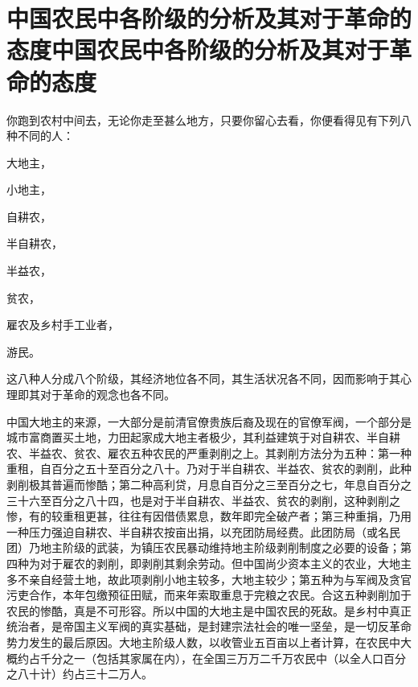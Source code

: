 \section[中国农民中各阶级的分析及其对于革命的态度中国农民中各阶级的分析及其对于革命的态度]{中国农民中各阶级的分析及其对于革命的态度中国农民中各阶级的分析及其对于革命的态度}


你跑到农村中间去，无论你走至甚么地方，只要你留心去看，你便看得见有下列八种不同的人：

大地主，

小地主，

自耕农，

半自耕农，

半益农，

贫农，

雇农及乡村手工业者，

游民。

这八种人分成八个阶级，其经济地位各不同，其生活状况各不同，因而影响于其心理即其对于革命的观念也各不同。

中国大地主的来源，一大部分是前清官僚贵族后裔及现在的官僚军阀，一个部分是城市富商置买土地，力田起家成大地主者极少，其利益建筑于对自耕农、半自耕农、半益农、贫农、雇农五种农民的严重剥削之上。其剥削方法分为五种：第一种重租，自百分之五十至百分之八十。乃对于半自耕农、半益农、贫农的剥削，此种剥削极其普遍而惨酷；第二种高利贷，月息自百分之三至百分之七，年息自百分之三十六至百分之八十四，也是对于半自耕农、半益农、贫农的剥削，这种剥削之惨，有的较重租更甚，往往有因借债累息，数年即完全破产者；第三种重捐，乃用一种压力强迫自耕农、半自耕农按亩出捐，以充团防局经费。此团防局（或名民团）乃地主阶级的武装，为镇压农民暴动维持地主阶级剥削制度之必要的设备；第四种为对于雇农的剥削，即剥削其剩余劳动。但中国尚少资本主义的农业，大地主多不亲自经营土地，故此项剥削小地主较多，大地主较少；第五种为与军阀及贪官污吏合作，本年包缴预征田赋，而来年索取重息于完粮之农民。合这五种剥削加于农民的惨酷，真是不可形容。所以中国的大地主是中国农民的死敌。是乡村中真正统治者，是帝国主义军阀的真实基础，是封建宗法社会的唯一坚垒，是一切反革命势力发生的最后原因。大地主阶级人数，以收管业五百亩以上者计算，在农民中大概约占千分之一（包括其家属在内），在全国三万万二千万农民中（以全人口百分之八十计）约占三十二万人。

